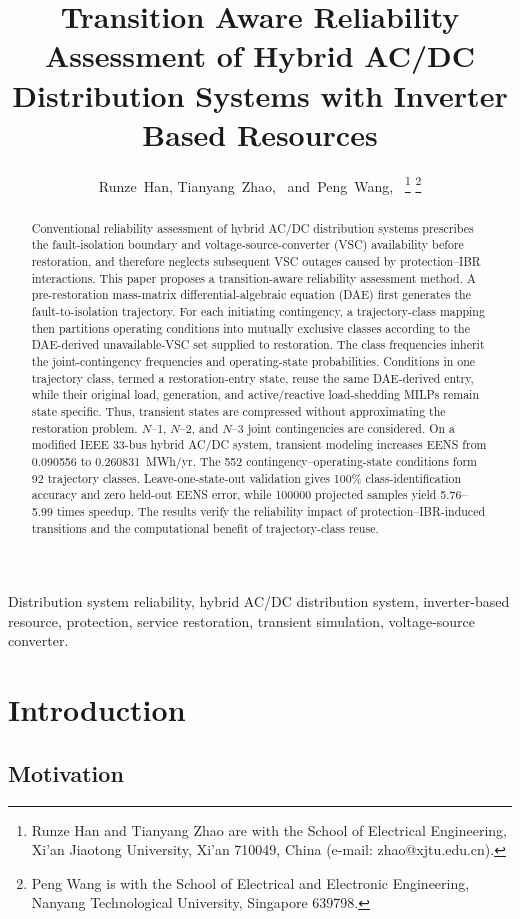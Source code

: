 \documentclass[journal]{IEEEtran}
\title{Transition Aware Reliability Assessment of Hybrid AC/DC Distribution
Systems with Inverter Based Resources}
\author{Runze~Han,
        Tianyang~Zhao,~\IEEEmembership{Member,~IEEE,}
        and~Peng~Wang,~\IEEEmembership{Fellow,~IEEE}%
\thanks{Runze Han and Tianyang Zhao are with the School of Electrical
Engineering, Xi'an Jiaotong University, Xi'an 710049, China (e-mail:
zhao@xjtu.edu.cn).}%
\thanks{Peng Wang is with the School of Electrical and Electronic Engineering,
Nanyang Technological University, Singapore 639798.}}
\begin{document}
\maketitle

\begin{abstract}
Conventional reliability assessment of hybrid AC/DC distribution systems
prescribes the fault-isolation boundary and voltage-source-converter (VSC)
availability before restoration, and therefore neglects subsequent VSC outages
caused by protection--IBR interactions. This paper proposes a transition-aware
reliability assessment method. A pre-restoration mass-matrix
differential-algebraic equation (DAE) first generates the fault-to-isolation
trajectory. For each initiating contingency, a trajectory-class mapping then
partitions operating conditions into mutually exclusive classes according to
the DAE-derived unavailable-VSC set supplied to restoration. The class
frequencies inherit the joint-contingency frequencies and
operating-state probabilities. Conditions in one trajectory class, termed a
restoration-entry state, reuse the same DAE-derived entry, while their original
load, generation, and active/reactive load-shedding MILPs remain state specific.
Thus, transient states are compressed without approximating the restoration
problem. $N$--1, $N$--2, and $N$--3 joint contingencies are considered.
On a modified IEEE 33-bus hybrid AC/DC system, transient modeling increases EENS
from 0.090556 to 0.260831~MWh/yr. The 552 contingency--operating-state conditions
form 92 trajectory classes. Leave-one-state-out validation gives 100\%
class-identification accuracy and zero held-out EENS error, while 100000
projected samples yield 5.76--5.99 times speedup. The results verify the
reliability impact of protection--IBR-induced transitions and the computational
benefit of trajectory-class reuse.
\end{abstract}

\begin{IEEEkeywords}
Distribution system reliability, hybrid AC/DC distribution system,
inverter-based resource, protection, service restoration, transient simulation,
voltage-source converter.
\end{IEEEkeywords}

\section{Introduction}

\subsection{Motivation}
\end{document}
